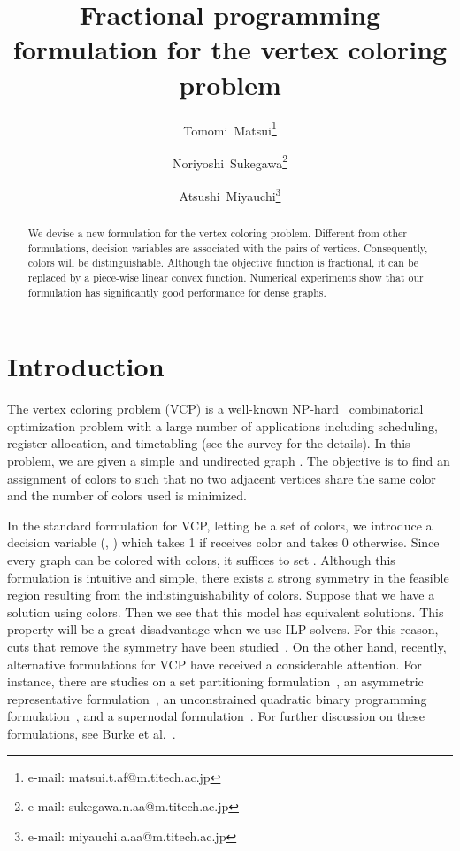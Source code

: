 \documentclass[11pt,a4paper]{article}
\title{Fractional programming formulation for the vertex coloring problem}
\date{\empty}
\author{Tomomi~Matsui\thanks{e-mail: matsui.t.af@m.titech.ac.jp}}
\author{Noriyoshi~Sukegawa\thanks{e-mail: sukegawa.n.aa@m.titech.ac.jp}}
\author{Atsushi~Miyauchi\thanks{e-mail: miyauchi.a.aa@m.titech.ac.jp}}
\affil{{\small \it{Graduate School of Decision Science and Technology, 
Tokyo Institute of Technology, Ookayama 2-12-1, Meguro-ku, Tokyo 152-8552, Japan}}}
\begin{document}
\maketitle
\vspace{-8mm}

\begin{abstract}
We devise a new formulation for the vertex coloring problem. 
Different from other formulations, 
decision variables are associated with the pairs of vertices. 
Consequently, colors will be distinguishable. 
Although the objective function is fractional, 
it can be replaced by a piece-wise linear convex function. 
Numerical experiments show that our formulation has significantly good performance for dense graphs. 
\end{abstract}

\section{Introduction} \label{sec:Intro}

The vertex coloring problem (VCP) is a well-known NP-hard~\cite{GaJo} combinatorial optimization problem 
with a large number of applications including scheduling, register allocation, and timetabling 
(see the survey \cite{MaTo} for the details). 
In this problem, 
we are given a simple and undirected graph . 
The objective is to find an assignment of colors to  such that 
no two adjacent vertices share the same color and 
the number of colors used is minimized. 

\par 

In the standard formulation for VCP, letting  be a set of colors, 
we introduce a decision variable  (, ) 
which takes 1 if  receives color  and takes 0 otherwise. 
Since every graph can be colored with  colors, 
it suffices to set . 
Although this formulation is intuitive and simple, 
there exists a strong symmetry in the feasible region 
resulting from the indistinguishability of colors. 
Suppose that we have a solution using  colors. 
Then we see that this model has  equivalent solutions. 
This property will be a great disadvantage when we use ILP solvers. 
For this reason, cuts that remove the symmetry have been studied~\cite{MeZa, MeZa2}. 
On the other hand, recently, alternative formulations for VCP have received a considerable attention. 
For instance, there are studies on a set partitioning formulation~\cite{MeTr}, 
an asymmetric representative formulation~\cite{CaCaCo,CaCoFr}, 
an unconstrained quadratic binary programming formulation~\cite{KoGlAlRe}, and a supernodal formulation~\cite{Bu}. 
For further discussion on these formulations, see Burke et al.~\cite{Bu}. 
\end{document}
